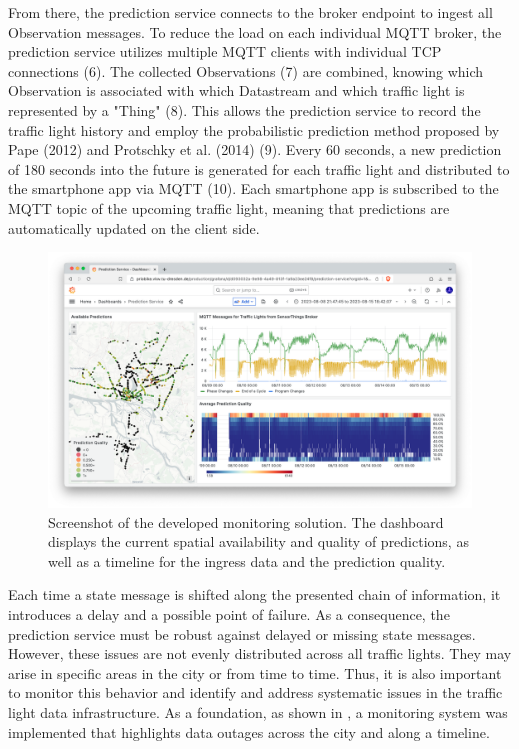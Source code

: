 From there, the prediction service connects to the broker endpoint to ingest all Observation messages. To reduce the load on each individual MQTT broker, the prediction service utilizes multiple MQTT clients with individual TCP connections (6). The collected Observations (7) are combined, knowing which Observation is associated with which Datastream and which traffic light is represented by a "Thing" (8). This allows the prediction service to record the traffic light history and employ the probabilistic prediction method proposed by Pape (2012) \cite{pape_untersuchung_2012} and Protschky et al. (2014) \cite{protschky_extensive_2014, protschky_adaptive_2014} (9). Every 60 seconds, a new prediction of 180 seconds into the future is generated for each traffic light and distributed to the smartphone app via MQTT (10). Each smartphone app is subscribed to the MQTT topic of the upcoming traffic light, meaning that predictions are automatically updated on the client side.

\begin{figure}[t]
\centering
\includegraphics[width=\linewidth]{images/monitoring-screenshot.png}
\caption{Screenshot of the developed monitoring solution. The dashboard displays the current spatial availability and quality of predictions, as well as a timeline for the ingress data and the prediction quality.}
\label{fig:monitoring-screenshot}
\end{figure}

Each time a state message is shifted along the presented chain of information, it introduces a delay and a possible point of failure. As a consequence, the prediction service must be robust against delayed or missing state messages. However, these issues are not evenly distributed across all traffic lights. They may arise in specific areas in the city or from time to time. Thus, it is also important to monitor this behavior and identify and address systematic issues in the traffic light data infrastructure. As a foundation, as shown in , a monitoring system was implemented that highlights data outages across the city and along a timeline.

